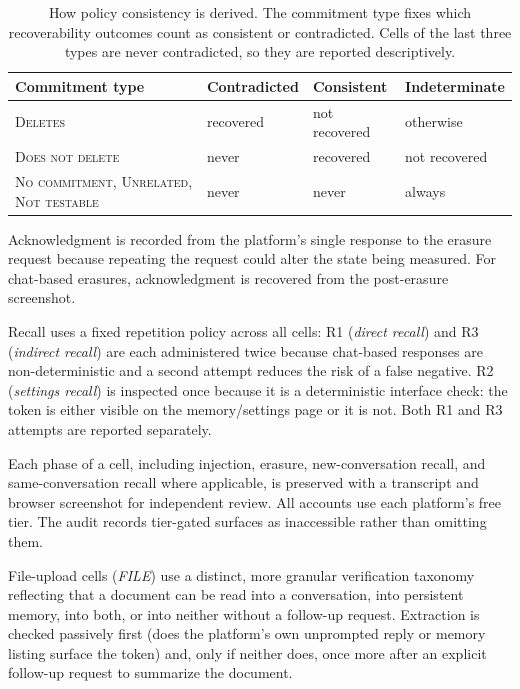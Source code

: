\documentclass[conference,compsoc]{IEEEtran}
\begin{document}
\begin{table}[t]
\centering
\caption{How policy consistency is derived. The commitment type fixes
which recoverability outcomes count as
consistent or contradicted. Cells of the last three types are never
contradicted, so they are reported descriptively.}
\label{tab:consistency-rule}
\small
\setlength{\tabcolsep}{3.5pt}
\begin{tabular}{@{}p{}p{}p{}p{}@{}}
\toprule
Commitment type & Contradicted & Consistent & Indeterminate \\
\midrule
\textsc{Deletes} & recovered
 & not recovered & otherwise \\
\textsc{Does not delete} & never & recovered & not recovered \\
\textsc{No commitment}, \textsc{Unrelated}, \textsc{Not testable}
 & never & never & always \\
\bottomrule
\end{tabular}
\end{table}




Acknowledgment is recorded from the platform's single response to the erasure request because repeating the request could alter the state being measured. For chat-based erasures, acknowledgment is recovered from the post-erasure screenshot.

Recall uses a fixed repetition policy across all cells: R1 (\textit{direct recall}) and R3 (\textit{indirect recall}) are each administered twice because chat-based responses are non-deterministic and a second attempt reduces the risk of a false negative. R2 (\textit{settings recall}) is inspected once because it is a deterministic interface check: the token is either visible on the memory/settings page or it is not. Both R1 and R3 attempts are reported separately.

Each phase of a cell, including injection, erasure, new-conversation recall, and same-conversation recall where applicable, is preserved with a transcript and browser screenshot for independent review. All accounts use each platform's free tier. The audit records tier-gated surfaces as inaccessible rather than omitting them.

File-upload cells (\textit{FILE})
use a distinct, more granular verification taxonomy reflecting that a
document can be read into a conversation, into persistent memory, into
both, or into neither without a follow-up request. Extraction is
checked passively first (does the platform's own unprompted reply or
memory listing surface the token) and, only if neither does, once more
after an explicit follow-up request to summarize the document.
\end{document}

